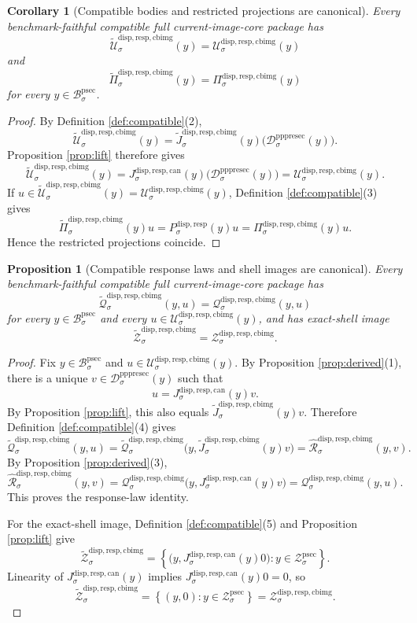 \documentclass[11pt]{article}
\newcommand{\ProtoSectionBody}[1]{\mathcal B_{#1}^{\mathrm{psec}}}
\newcommand{\ProtoSectionShell}[1]{\mathcal Z_{#1}^{\mathrm{psec}}}
\newcommand{\PrePreProtoSectionResidualBody}[1]{\mathcal D_{#1}^{\mathrm{pppresec}}}
\newcommand{\SubstrateProjection}[1]{P_{#1}^{\mathrm{disp,resp}}}
\newcommand{\CanonicalLift}[1]{J_{#1}^{\mathrm{disp,resp,can}}}
\newcommand{\CoreForcedBodyResponse}[1]{\widehat{\mathscr R}_{#1}^{\mathrm{disp,resp,cbimg}}}
\newcommand{\CanonicalImageBody}[1]{\mathcal U_{#1}^{\mathrm{disp,resp,cbimg}}}
\newcommand{\ImageProjection}[1]{\Pi_{#1}^{\mathrm{disp,resp,cbimg}}}
\newcommand{\CanonicalImageResponseLaw}[1]{\mathscr Q_{#1}^{\mathrm{disp,resp,cbimg}}}
\newcommand{\CanonicalImageShell}[1]{\mathcal Z_{#1}^{\mathrm{disp,resp,cbimg}}}
\newcommand{\CompatibleImageBody}[1]{\widetilde{\mathcal U}_{#1}^{\mathrm{disp,resp,cbimg}}}
\newcommand{\CompatibleImageProjection}[1]{\widetilde{\Pi}_{#1}^{\mathrm{disp,resp,cbimg}}}
\newcommand{\CompatibleImageLift}[1]{\widetilde J_{#1}^{\mathrm{disp,resp,cbimg}}}
\newcommand{\CompatibleImageResponseLaw}[1]{\widetilde{\mathscr Q}_{#1}^{\mathrm{disp,resp,cbimg}}}
\newcommand{\CompatibleImageShell}[1]{\widetilde{\mathcal Z}_{#1}^{\mathrm{disp,resp,cbimg}}}
\newtheorem{proposition}{Proposition}
\newtheorem{corollary}{Corollary}
\begin{document}
\begin{corollary}[Compatible bodies and restricted projections are canonical]
\label{cor:bodyprojection}
Every benchmark-faithful compatible full current-image-core package has
\[
\CompatibleImageBody{\sigma}(y)=\CanonicalImageBody{\sigma}(y)
\]
and
\[
\CompatibleImageProjection{\sigma}(y)=\ImageProjection{\sigma}(y)
\]
for every \(y\in\ProtoSectionBody{\sigma}\).
\end{corollary}

\begin{proof}
By Definition \ref{def:compatible}(2),
\[
\CompatibleImageBody{\sigma}(y)
=
\CompatibleImageLift{\sigma}(y)\bigl(\PrePreProtoSectionResidualBody{\sigma}(y)\bigr).
\]
Proposition \ref{prop:lift} therefore gives
\[
\CompatibleImageBody{\sigma}(y)
=
\CanonicalLift{\sigma}(y)\bigl(\PrePreProtoSectionResidualBody{\sigma}(y)\bigr)
=
\CanonicalImageBody{\sigma}(y).
\]
If \(u\in\CompatibleImageBody{\sigma}(y)=\CanonicalImageBody{\sigma}(y)\), Definition \ref{def:compatible}(3) gives
\[
\CompatibleImageProjection{\sigma}(y)u
=
\SubstrateProjection{\sigma}(y)u
=
\ImageProjection{\sigma}(y)u.
\]
Hence the restricted projections coincide.
\end{proof}

\begin{proposition}[Compatible response laws and shell images are canonical]
\label{prop:responseandshell}
Every benchmark-faithful compatible full current-image-core package has
\[
\CompatibleImageResponseLaw{\sigma}(y,u)
=
\CanonicalImageResponseLaw{\sigma}(y,u)
\]
for every \(y\in\ProtoSectionBody{\sigma}\) and every \(u\in\CanonicalImageBody{\sigma}(y)\), and has exact-shell image
\[
\CompatibleImageShell{\sigma}
=
\CanonicalImageShell{\sigma}.
\]
\end{proposition}

\begin{proof}
Fix \(y\in\ProtoSectionBody{\sigma}\) and \(u\in\CanonicalImageBody{\sigma}(y)\). By Proposition \ref{prop:derived}(1), there is a unique \(v\in\PrePreProtoSectionResidualBody{\sigma}(y)\) such that
\[
u=\CanonicalLift{\sigma}(y)v.
\]
By Proposition \ref{prop:lift}, this also equals \(\CompatibleImageLift{\sigma}(y)v\). Therefore Definition \ref{def:compatible}(4) gives
\[
\CompatibleImageResponseLaw{\sigma}(y,u)
=
\CompatibleImageResponseLaw{\sigma}\bigl(y,\CompatibleImageLift{\sigma}(y)v\bigr)
=
\CoreForcedBodyResponse{\sigma}(y,v).
\]
By Proposition \ref{prop:derived}(3),
\[
\CoreForcedBodyResponse{\sigma}(y,v)
=
\CanonicalImageResponseLaw{\sigma}\bigl(y,\CanonicalLift{\sigma}(y)v\bigr)
=
\CanonicalImageResponseLaw{\sigma}(y,u).
\]
This proves the response-law identity.

For the exact-shell image, Definition \ref{def:compatible}(5) and Proposition \ref{prop:lift} give
\[
\CompatibleImageShell{\sigma}
=
\left\{
\bigl(y,\CanonicalLift{\sigma}(y)0\bigr):y\in\ProtoSectionShell{\sigma}
\right\}.
\]
Linearity of \(\CanonicalLift{\sigma}(y)\) implies \(\CanonicalLift{\sigma}(y)0=0\), so
\[
\CompatibleImageShell{\sigma}
=
\left\{
(y,0):y\in\ProtoSectionShell{\sigma}
\right\}
=
\CanonicalImageShell{\sigma}.
\]
\end{proof}
\end{document}
